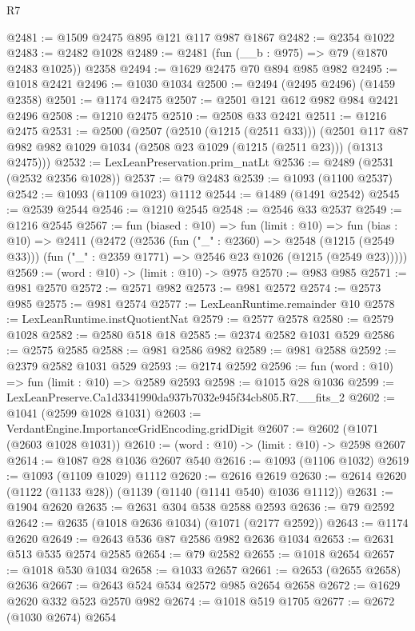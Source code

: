 \begin{lexlean}{R7}
\begin{coremodule}
@2481 := @1509 @2475 @895 @121 @117 @987 @1867
@2482 := @2354 @1022
@2483 := @2482 @1028
@2489 := @2481 (fun (__b : @975) => @79 (@1870 @2483 @1025)) @2358
@2494 := @1629 @2475 @70 @894 @985 @982
@2495 := @1018 @2421
@2496 := @1030 @1034
@2500 := @2494 (@2495 @2496) (@1459 @2358)
@2501 := @1174 @2475
@2507 := @2501 @121 @612 @982 @984 @2421 @2496
@2508 := @1210 @2475
@2510 := @2508 @33 @2421
@2511 := @1216 @2475
@2531 := @2500
    (@2507
      (@2510 (@1215 (@2511 @33)))
      (@2501 @117 @87 @982 @982 @1029 @1034 (@2508 @23 @1029 (@1215 (@2511 @23))) (@1313 @2475)))
@2532 := LexLeanPreservation.prim_natLt
@2536 := @2489 (@2531 (@2532 @2356 @1028))
@2537 := @79 @2483
@2539 := @1093 (@1100 @2537)
@2542 := @1093 (@1109 @1023) @1112
@2544 := @1489 (@1491 @2542)
@2545 := @2539 @2544
@2546 := @1210 @2545
@2548 := @2546 @33 @2537
@2549 := @1216 @2545
@2567 := fun (biased : @10) =>
  fun (limit : @10) =>
  fun (bias : @10) =>
  @2411
    (@2472
      (@2536
        (fun ("_" : @2360) => @2548 (@1215 (@2549 @33)))
        (fun ("_" : @2359 @1771) => @2546 @23 @1026 (@1215 (@2549 @23)))))
@2569 := (word : @10) -> (limit : @10) -> @975
@2570 := @983 @985
@2571 := @981 @2570
@2572 := @2571 @982
@2573 := @981 @2572
@2574 := @2573 @985
@2575 := @981 @2574
@2577 := LexLeanRuntime.remainder @10
@2578 := LexLeanRuntime.instQuotientNat
@2579 := @2577 @2578
@2580 := @2579 @1028
@2582 := @2580 @518 @18
@2585 := @2374 @2582 @1031 @529
@2586 := @2575 @2585
@2588 := @981 @2586 @982
@2589 := @981 @2588
@2592 := @2379 @2582 @1031 @529
@2593 := @2174 @2592
@2596 := fun (word : @10) => fun (limit : @10) => @2589 @2593
@2598 := @1015 @28 @1036
@2599 := LexLeanPreserve.Ca1d3341990da937b7032e945f34cb805.R7.__fits_2
@2602 := @1041 (@2599 @1028 @1031)
@2603 := VerdantEngine.ImportanceGridEncoding.gridDigit
@2607 := @2602 (@1071 (@2603 @1028 @1031))
@2610 := (word : @10) -> (limit : @10) -> @2598 @2607
@2614 := @1087 @28 @1036 @2607 @540
@2616 := @1093 (@1106 @1032)
@2619 := @1093 (@1109 @1029) @1112
@2620 := @2616 @2619
@2630 := @2614 @2620 (@1122 (@1133 @28)) (@1139 (@1140 (@1141 @540) @1036 @1112))
@2631 := @1904 @2620
@2635 := @2631 @304 @538 @2588 @2593
@2636 := @79 @2592
@2642 := @2635 (@1018 @2636 @1034) (@1071 (@2177 @2592))
@2643 := @1174 @2620
@2649 := @2643 @536 @87 @2586 @982 @2636 @1034
@2653 := @2631 @513 @535 @2574 @2585
@2654 := @79 @2582
@2655 := @1018 @2654
@2657 := @1018 @530 @1034
@2658 := @1033 @2657
@2661 := @2653 (@2655 @2658) @2636
@2667 := @2643 @524 @534 @2572 @985 @2654 @2658
@2672 := @1629 @2620 @332 @523 @2570 @982
@2674 := @1018 @519 @1705
@2677 := @2672 (@1030 @2674) @2654

\end{coremodule}
\end{lexlean}
